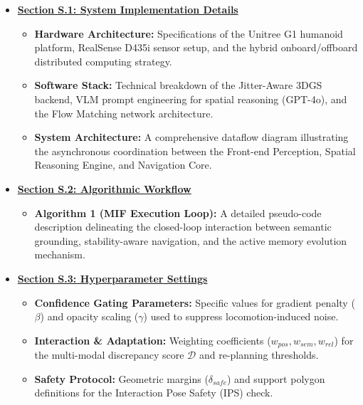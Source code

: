 \documentclass[conference]{IEEEtran}
\begin{document}
\begin{strip}
\begin{center}
\begin{minipage}{0.96\textwidth}
\begin{itemize} \setlength{\itemsep}{0.3em} \setlength{\parskip}{0pt} \setlength{\parsep}{0pt}
    \item \textbf{\hyperref[sec:implementation_details]{Section S.1: System Implementation Details}}
    \begin{itemize} \setlength{\itemsep}{1pt} \setlength{\topsep}{0pt} \small
        \item \textbf{Hardware Architecture:} Specifications of the Unitree G1 humanoid platform, RealSense D435i sensor setup, and the hybrid onboard/offboard distributed computing strategy.
        \item \textbf{Software Stack:} Technical breakdown of the Jitter-Aware 3DGS backend, VLM prompt engineering for spatial reasoning (GPT-4o), and the Flow Matching network architecture.
        \item \textbf{System Architecture:} A comprehensive dataflow diagram illustrating the asynchronous coordination between the Front-end Perception, Spatial Reasoning Engine, and Navigation Core.
    \end{itemize}

    \item \textbf{\hyperref[sec:algo_workflow]{Section S.2: Algorithmic Workflow}}
    \begin{itemize} \setlength{\itemsep}{1pt} \setlength{\topsep}{0pt} \small
        \item \textbf{Algorithm 1 (MIF Execution Loop):} A detailed pseudo-code description delineating the closed-loop interaction between semantic grounding, stability-aware navigation, and the active memory evolution mechanism.
    \end{itemize}

    \item \textbf{\hyperref[sec:hyperparameters]{Section S.3: Hyperparameter Settings}}
    \begin{itemize} \setlength{\itemsep}{1pt} \setlength{\topsep}{0pt} \small
        \item \textbf{Confidence Gating Parameters:} Specific values for gradient penalty ($\beta$) and opacity scaling ($\gamma$) used to suppress locomotion-induced noise.
        \item \textbf{Interaction & Adaptation:} Weighting coefficients ($w_{pos}, w_{sem}, w_{rel}$) for the multi-modal discrepancy score $\mathcal{D}$ and re-planning thresholds.
        \item \textbf{Safety Protocol:} Geometric margins ($\delta_{safe}$) and support polygon definitions for the Interaction Pose Safety (IPS) check.
    \end{itemize}


\end{itemize}
\end{minipage}
\end{center}
\end{strip}
\end{document}
